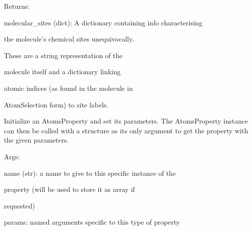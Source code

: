 \documentclass[letterpaper,10pt,english]{sphinxmanual}
\begin{document}
\begin{fulllineitems}
\begin{DUlineblock}{0em}
\item[] Returns:
\item[]
\begin{DUlineblock}{\DUlineblockindent}
\item[] molecular\_sites (dict): A dictionary containing info characterising
\item[]
\begin{DUlineblock}{\DUlineblockindent}
\item[] the molecule's chemical sites unequivocally.
\item[] These are a string representation of the
\item[] molecule itself and a dictionary linking
\item[] atomic indices (as found in the molecule in
\item[] AtomSelection form) to site labels.
\end{DUlineblock}
\end{DUlineblock}
\end{DUlineblock}

Initialize an AtomsProperty and set its parameters.
The AtomsProperty instance can then be called with a structure as its
only argument to get the property with the given parameters.

\begin{DUlineblock}{0em}
\item[] Args:
\item[]
\begin{DUlineblock}{\DUlineblockindent}
\item[] name (str): a name to give to this specific instance of the
\item[]
\begin{DUlineblock}{\DUlineblockindent}
\item[] property (will be used to store it as array if
\item[] requested)
\end{DUlineblock}
\item[] params: named arguments specific to this type of property
\end{DUlineblock}
\end{DUlineblock}

\begin{fulllineitems}
\label{doctree/soprano.properties.labeling.labeling:soprano.properties.labeling.labeling.MoleculeSites.default_name}
\end{fulllineitems}


\end{fulllineitems}
\end{document}
